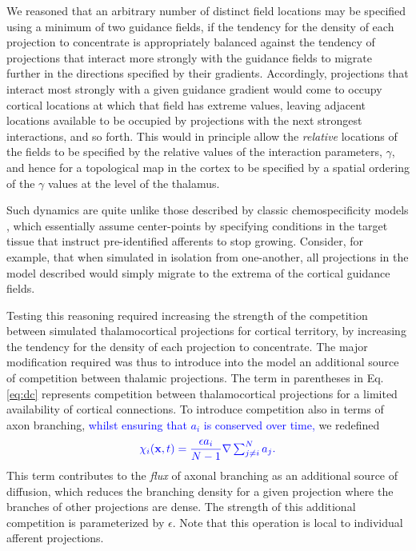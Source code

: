 \documentclass[9pt,lineno]{elife}
\newcommand{\cmnt}[1]{\textcolor{blue}{#1}}
\newcommand{\justifycomp}[1]{\textcolor{revpurp2}{#1}}
\newcommand{\mb}[1]{\mathbf{#1}}
\begin{document}
\justifycomp{We reasoned that an arbitrary number of distinct field locations
  may be specified using a minimum of two guidance fields, if the tendency for
  the density of each projection to concentrate is appropriately balanced
  against the tendency of projections that interact more strongly with the
  guidance fields to migrate further in the directions specified by their
  gradients. Accordingly, projections that interact most strongly with a given
  guidance gradient would come to occupy cortical locations at which that
  field has extreme values, leaving adjacent locations available to be
  occupied by projections with the next strongest interactions, and so
  forth. This would in principle allow the \emph{relative} locations of the
  fields to be specified by the relative values of the interaction parameters,
  $\gamma$, and hence for a topological map in the cortex to be specified by a
  spatial ordering of the $\gamma$ values at the level of the thalamus.}

\justifycomp{Such dynamics are quite unlike those described by classic
  chemospecificity models} \citep{sperry_chemoaffinity_1963},
\justifycomp{which essentially assume center-points by specifying conditions
  in the target tissue that instruct pre-identified afferents to stop
  growing. Consider, for example, that when simulated in isolation from
  one-another, all projections in the model described would simply migrate to
  the extrema of the cortical guidance fields.}

\justifycomp{Testing this reasoning required increasing the strength of the
  competition between simulated thalamocortical projections for cortical
  territory, by increasing the tendency for the density of each projection to
  concentrate. The major modification required was thus to introduce into the
  model an additional source of competition between thalamic projections.}
%
The term in parentheses in Eq.\,\ref{eq:dc} represents competition between
thalamocortical projections for a limited availability of cortical
connections. To introduce competition also in terms of axon branching,
\cmnt{whilst ensuring that $a_i$ is conserved over time,} we
redefined
%
\begin{equation} \label{eq:comp}
  \color{blue}
  \chi_i(\mb{x}, t) = \frac{\epsilon a_i}{N-1} \nabla \textstyle\sum_{j\ne i}^{N}{a_j}.
  \color{black}
\end{equation}
%
\justifycomp{This term contributes to the \emph{flux} of axonal branching as
  an additional source of diffusion, which reduces the branching density for a
  given projection where the branches of other projections are dense. The
  strength of this additional competition is parameterized by
  $\epsilon$}. Note that this operation is local to individual afferent
projections.
\end{document}

